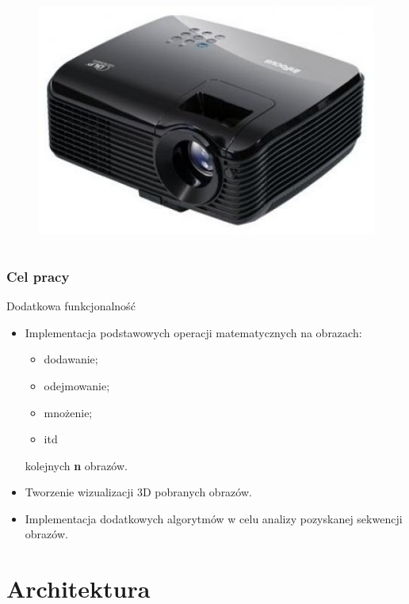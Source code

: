 \documentclass{beamer}
\begin{document}
\begin{frame}
\begin{columns}
\begin{column}{6cm}
      \begin{figure}[htb]
	\begin{center}
	  \includegraphics[angle=0,scale=0.2]{projektor.jpg}
	\end{center}
      \end{figure}
    \end{column}
    
  \end{columns}
  
\end{frame}


\begin{frame}\frametitle{Cel pracy}
  \begin{block}{Dodatkowa funkcjonalność}
    \begin{itemize}
    \item Implementacja podstawowych operacji matematycznych na obrazach:
      \begin{itemize}
      \item dodawanie;
      \item odejmowanie;
      \item mnożenie;
      \item itd
      \end{itemize}
	kolejnych \textbf{n} obrazów.\pause
    \item Tworzenie wizualizacji 3D pobranych obrazów.\pause
    \item Implementacja dodatkowych algorytmów w celu analizy pozyskanej sekwencji obrazów.
    \end{itemize}
  \end{block}
\end{frame}


\section{Architektura}
\end{document}
